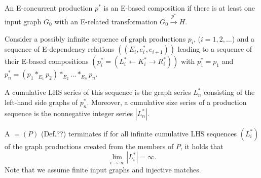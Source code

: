 \begin{definition}[E-graph]
\end{definition}

\begin{definition}
\end{definition}

\begin{definition}[production]
\end{definition}

\begin{definition}
    An E-concurrent production $p^*$ is an E-based composition if there is at least one input graph $G_0$ with an E-related transformation $G_0 \xrightarrow{p^*} H$.
\end{definition}

\begin{definition}
    Consider a possibly infinite sequence of graph productions $p_i$, ($i \mathop{=} 1, 2, \ldots$) and a sequence of E-dependency relations $((E_i, e_i^*, e_{i+1}))$ leading to a sequence of their E-based compositions $(p_i^* \mathop{=} (L_i^* \mathop{\leftarrow} K_i^* \mathop{\rightarrow} R_i^*))$ with $p_1^* \mathop{=} p_1$ and $p_n^* \mathop{=} (p_1 *_{E_1} p_2) *_{E_2} \ldots *_{E_n} p_n$.
    
    A cumulative LHS series of this sequence is the graph series $L_n^*$ consisting of the left-hand side graphs of $p_n^*$. Moreover, a cumulative size series of a production sequence is the nonnegative integer series $|L_n^*|$.
    \end{definition}

\begin{theorem}
    A  $= (P)$ (Def.??) terminates if for all infinite cumulative LHS sequences $(L_i^*)$ of the graph productions created from the members of $P$, it holds that
    \[
    \lim_{i \mathop{\to} \infty} |L_i^*| \mathop{=} \infty.
    \]
    Note that we assume finite input graphs and injective matches.
\end{theorem}